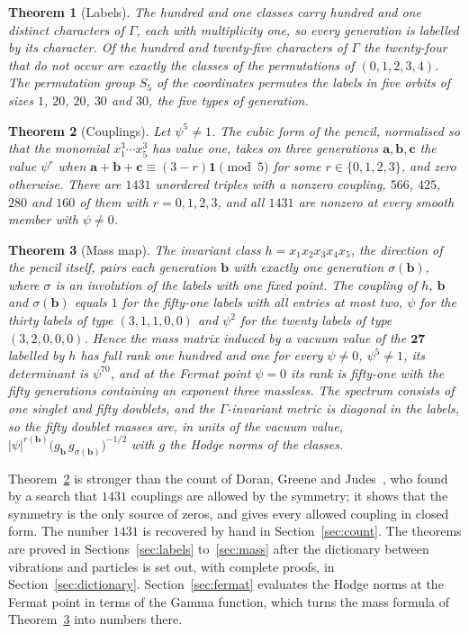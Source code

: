 \documentclass[11pt]{amsart}
\newtheorem{theorem}{Theorem}
\theoremstyle{definition}
\theoremstyle{remark}
\newcommand{\bb}{\mathbf{b}}
\newcommand{\cc}{\mathbf{c}}
\newcommand{\va}{\mathbf{a}}
\newcommand{\one}{\mathbf{1}}
\begin{document}
\begin{theorem}[Labels]\label{thm:A}
The hundred and one classes carry hundred and one distinct characters of
$\Gamma$, each with multiplicity one, so every generation is labelled by
its character. Of the hundred and twenty-five characters of $\Gamma$ the
twenty-four that do not occur are exactly the classes of the permutations
of $(0,1,2,3,4)$. The permutation group $S_5$ of the coordinates permutes
the labels in five orbits of sizes $1$, $20$, $20$, $30$ and $30$, the five
types of generation.
\end{theorem}

\begin{theorem}[Couplings]\label{thm:B}
Let $\psi^5\ne1$. The cubic form of the pencil, normalised so that the
monomial $x_1^3\cdots x_5^3$ has value one, takes on three generations
$\va,\bb,\cc$ the value $\psi^{r}$ when $\va+\bb+\cc\equiv(3-r)\one\pmod 5$
for some $r\in\{0,1,2,3\}$, and zero otherwise. There are $1431$ unordered
triples with a nonzero coupling, $566$, $425$, $280$ and $160$ of them with
$r=0,1,2,3$, and all $1431$ are nonzero at every smooth member with
$\psi\ne0$.
\end{theorem}

\begin{theorem}[Mass map]\label{thm:C}
The invariant class $h=x_1x_2x_3x_4x_5$, the direction of the pencil
itself, pairs each generation $\bb$ with exactly one generation
$\sigma(\bb)$, where $\sigma$ is an involution of the labels with one fixed
point. The coupling of $h$, $\bb$ and $\sigma(\bb)$ equals $1$ for the
fifty-one labels with all entries at most two, $\psi$ for the thirty labels
of type $(3,1,1,0,0)$ and $\psi^2$ for the twenty labels of type
$(3,2,0,0,0)$. Hence the mass matrix induced by a vacuum value of the
$\mathbf{27}$ labelled by $h$ has full rank one hundred and one for every
$\psi\ne0$, $\psi^5\ne1$, its determinant is $\psi^{70}$, and at the
Fermat point $\psi=0$ its rank is fifty-one with the fifty generations
containing an exponent three massless. The spectrum consists of one singlet
and fifty doublets, and the $\Gamma$-invariant metric is diagonal in the
labels, so the fifty doublet masses are, in units of the vacuum value,
$|\psi|^{r(\bb)}\big(g_{\bb}\,g_{\sigma(\bb)}\big)^{-1/2}$ with $g$ the
Hodge norms of the classes.
\end{theorem}

Theorem~\ref{thm:B} is stronger than the count of Doran, Greene and
Judes~\cite{DGJ08}, who found by a search that $1431$ couplings are allowed
by the symmetry; it shows that the symmetry is the only source of zeros, and
gives every allowed coupling in closed form. The number $1431$ is recovered
by hand in Section~\ref{sec:count}. The theorems are proved in
Sections~\ref{sec:labels} to~\ref{sec:mass} after the dictionary between
vibrations and particles is set out, with complete proofs, in
Section~\ref{sec:dictionary}. Section~\ref{sec:fermat} evaluates the Hodge
norms at the Fermat point in terms of the Gamma function, which turns the
mass formula of Theorem~\ref{thm:C} into numbers there.
\end{document}
